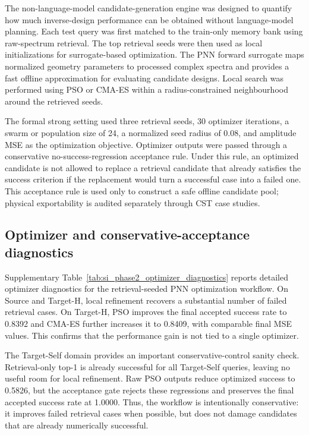 \documentclass[final,1p,times]{elsarticle}
\begin{document}
The non-language-model candidate-generation engine was designed to quantify how much inverse-design performance can be obtained without language-model planning. Each test query was first matched to the train-only memory bank using raw-spectrum retrieval. The top retrieval seeds were then used as local initializations for surrogate-based optimization. The PNN forward surrogate maps normalized geometry parameters to processed complex spectra and provides a fast offline approximation for evaluating candidate designs. Local search was performed using PSO or CMA-ES within a radius-constrained neighbourhood around the retrieved seeds.

The formal strong setting used three retrieval seeds, 30 optimizer iterations, a swarm or population size of 24, a normalized seed radius of 0.08, and amplitude MSE as the optimization objective. Optimizer outputs were passed through a conservative no-success-regression acceptance rule. Under this rule, an optimized candidate is not allowed to replace a retrieval candidate that already satisfies the success criterion if the replacement would turn a successful case into a failed one. This acceptance rule is used only to construct a safe offline candidate pool; physical exportability is audited separately through CST case studies.

\subsection{Optimizer and conservative-acceptance diagnostics}

Supplementary Table~\ref{tab:si_phase2_optimizer_diagnostics} reports detailed optimizer diagnostics for the retrieval-seeded PNN optimization workflow. On Source and Target-H, local refinement recovers a substantial number of failed retrieval cases. On Target-H, PSO improves the final accepted success rate to 0.8392 and CMA-ES further increases it to 0.8409, with comparable final MSE values. This confirms that the performance gain is not tied to a single optimizer.

The Target-Self domain provides an important conservative-control sanity check. Retrieval-only top-1 is already successful for all Target-Self queries, leaving no useful room for local refinement. Raw PSO outputs reduce optimized success to 0.5826, but the acceptance gate rejects these regressions and preserves the final accepted success rate at 1.0000. Thus, the workflow is intentionally conservative: it improves failed retrieval cases when possible, but does not damage candidates that are already numerically successful.
\end{document}
